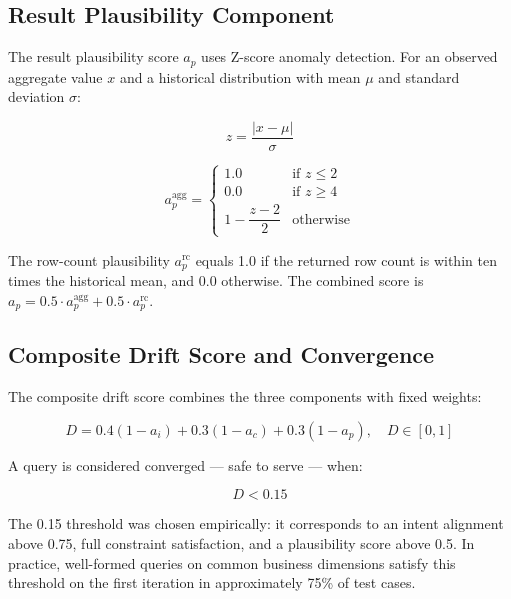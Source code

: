 \documentclass[12pt,a4paper]{report}
\begin{document}
\subsection{Result Plausibility Component}
\label{subsec:plausibility}

The result plausibility score $a_p$ uses Z-score anomaly detection. For an observed aggregate value $x$ and a historical distribution with mean $\mu$ and standard deviation $\sigma$:

\begin{equation}
  z = \frac{|x - \mu|}{\sigma}
  \label{eq:zscore}
\end{equation}

\begin{equation}
  a_p^{\text{agg}} =
  \begin{cases}
    1.0 & \text{if } z \leq 2 \\
    0.0 & \text{if } z \geq 4 \\
    1 - \dfrac{z - 2}{2} & \text{otherwise}
  \end{cases}
  \label{eq:plausibility}
\end{equation}

The row-count plausibility $a_p^{\text{rc}}$ equals 1.0 if the returned row count is within ten times the historical mean, and 0.0 otherwise. The combined score is $a_p = 0.5 \cdot a_p^{\text{agg}} + 0.5 \cdot a_p^{\text{rc}}$.

\subsection{Composite Drift Score and Convergence}
\label{subsec:composite-drift}

The composite drift score combines the three components with fixed weights:

\begin{equation}
  D = 0.4(1 - a_i) + 0.3(1 - a_c) + 0.3(1 - a_p), \quad D \in [0, 1]
  \label{eq:drift}
\end{equation}

A query is considered converged — safe to serve — when:

\begin{equation}
  D < 0.15
  \label{eq:convergence}
\end{equation}

The 0.15 threshold was chosen empirically: it corresponds to an intent alignment above 0.75, full constraint satisfaction, and a plausibility score above 0.5. In practice, well-formed queries on common business dimensions satisfy this threshold on the first iteration in approximately 75\% of test cases.
\end{document}
